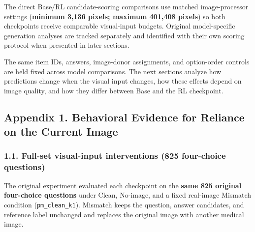 \documentclass[
  10pt,
  a4paper,
]{article}
\begin{document}
The direct Base/RL candidate-scoring comparisons use matched
image-processor settings (\textbf{minimum 3,136 pixels; maximum 401,408
pixels}) so both checkpoints receive comparable visual-input budgets.
Original model-specific generation analyses are tracked separately and
identified with their own scoring protocol when presented in later
sections.

The same item IDs, answers, image-donor assignments, and option-order
controls are held fixed across model comparisons. The next sections
analyze how predictions change when the visual input changes, how these
effects depend on image quality, and how they differ between Base and
the RL checkpoint.

\subsection{Appendix 1. Behavioral Evidence for Reliance on the Current
Image}\label{appendix-1.-behavioral-evidence-for-reliance-on-the-current-image}

\subsubsection{1.1. Full-set visual-input interventions (825 four-choice
questions)}\label{full-set-visual-input-interventions-825-four-choice-questions}

The original experiment evaluated each checkpoint on the \textbf{same
825 original four-choice questions} under Clean, No-image, and a fixed
real-image Mismatch condition (\texttt{pm\_clean\_k1}). Mismatch keeps
the question, answer candidates, and reference label unchanged and
replaces the original image with another medical image.
\end{document}
